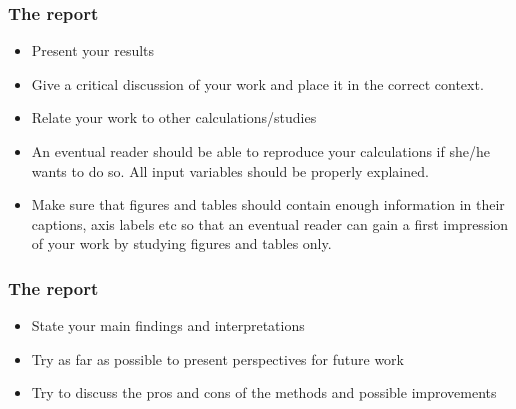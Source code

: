 \documentclass{beamer}
\newenvironment{block_mdfboxadmon}[1][]{\begin{block}{#1}}{\end{block}}
\begin{document}
\begin{frame}
\frametitle{The report}

\begin{block_mdfboxadmon}
\begin{itemize}
 \item Present your results

 \item Give a critical discussion of your work and place it in the correct context.

 \item Relate your work to other calculations/studies

 \item An eventual reader should be able to reproduce your calculations if she/he wants to do so. All input variables should be properly explained.

 \item Make sure that figures and tables should contain enough information in their captions, axis labels etc so that an eventual reader can gain a first impression of your work by studying figures and tables only.
\end{itemize}

\noindent
\end{block_mdfboxadmon}
\end{frame}

\begin{frame}
\frametitle{The report}

\begin{block_mdfboxadmon}
\begin{itemize}
 \item State your main findings and interpretations

 \item Try as far as possible to present perspectives for future work

 \item Try to discuss the pros and cons of the methods and possible improvements
\end{itemize}

\noindent
\end{block_mdfboxadmon}
\end{frame}
\end{document}

